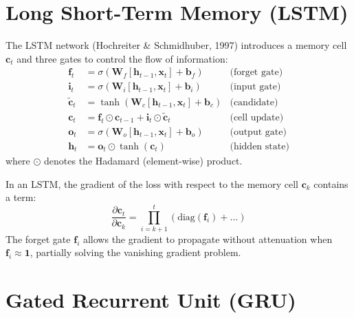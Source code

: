 \section{Long Short-Term Memory (LSTM)}
\label{sec:seq:lstm}

\begin{definition}[LSTM]
The LSTM network (Hochreiter \& Schmidhuber, 1997) introduces a memory cell
$\mathbf{c}_t$ and three gates to control the flow of information:
\begin{align}
\mathbf{f}_t &= \sigma(\mathbf{W}_f [\mathbf{h}_{t-1}, \mathbf{x}_t] + \mathbf{b}_f) & \text{(forget gate)} \\
\mathbf{i}_t &= \sigma(\mathbf{W}_i [\mathbf{h}_{t-1}, \mathbf{x}_t] + \mathbf{b}_i) & \text{(input gate)} \\
\tilde{\mathbf{c}}_t &= \tanh(\mathbf{W}_c [\mathbf{h}_{t-1}, \mathbf{x}_t] + \mathbf{b}_c) & \text{(candidate)} \\
\mathbf{c}_t &= \mathbf{f}_t \odot \mathbf{c}_{t-1} + \mathbf{i}_t \odot \tilde{\mathbf{c}}_t & \text{(cell update)} \\
\mathbf{o}_t &= \sigma(\mathbf{W}_o [\mathbf{h}_{t-1}, \mathbf{x}_t] + \mathbf{b}_o) & \text{(output gate)} \\
\mathbf{h}_t &= \mathbf{o}_t \odot \tanh(\mathbf{c}_t) & \text{(hidden state)}
\end{align}
where $\odot$ denotes the Hadamard (element-wise) product.
\end{definition}

\begin{proposition}
In an LSTM, the gradient of the loss with respect to the memory cell
$\mathbf{c}_k$ contains a term:
\[
\frac{\partial \mathbf{c}_t}{\partial \mathbf{c}_k} = \prod_{i=k+1}^{t} \left(\text{diag}(\mathbf{f}_i) + \ldots\right)
\]
The forget gate $\mathbf{f}_i$ allows the gradient to propagate without
attenuation when $\mathbf{f}_i \approx \mathbf{1}$, partially solving the
vanishing gradient problem.
\end{proposition}

\section{Gated Recurrent Unit (GRU)}
\label{sec:seq:gru}

